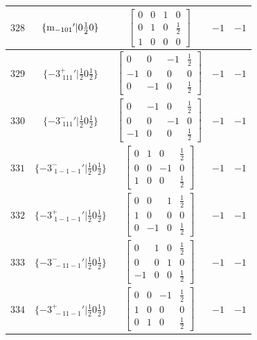 \documentclass[fleqn,8pt]{jsarticle}
\begin{document}
\begin{longtable}{ccccc}
$ 328 $ & $ \{{\rm m}_{-101}{}'|0 \frac{1}{2} 0\} $ & $ \begin{bmatrix} 0 & 0 & 1 & 0 \\ 0 & 1 & 0 & \frac{1}{2} \\ 1 & 0 & 0 & 0 \end{bmatrix} $ & $ -1 $ & $ -1 $ \\ \hline
$ 329 $ & $ \{-3^{+}_{\,\,111}{}'|\frac{1}{2} 0 \frac{1}{2}\} $ & $ \begin{bmatrix} 0 & 0 & -1 & \frac{1}{2} \\ -1 & 0 & 0 & 0 \\ 0 & -1 & 0 & \frac{1}{2} \end{bmatrix} $ & $ -1 $ & $ -1 $ \\ \hline
$ 330 $ & $ \{-3^{-}_{\,\,111}{}'|\frac{1}{2} 0 \frac{1}{2}\} $ & $ \begin{bmatrix} 0 & -1 & 0 & \frac{1}{2} \\ 0 & 0 & -1 & 0 \\ -1 & 0 & 0 & \frac{1}{2} \end{bmatrix} $ & $ -1 $ & $ -1 $ \\ \hline
$ 331 $ & $ \{-3^{-}_{\,\,1-1-1}{}'|\frac{1}{2} 0 \frac{1}{2}\} $ & $ \begin{bmatrix} 0 & 1 & 0 & \frac{1}{2} \\ 0 & 0 & -1 & 0 \\ 1 & 0 & 0 & \frac{1}{2} \end{bmatrix} $ & $ -1 $ & $ -1 $ \\ \hline
$ 332 $ & $ \{-3^{+}_{\,\,1-1-1}{}'|\frac{1}{2} 0 \frac{1}{2}\} $ & $ \begin{bmatrix} 0 & 0 & 1 & \frac{1}{2} \\ 1 & 0 & 0 & 0 \\ 0 & -1 & 0 & \frac{1}{2} \end{bmatrix} $ & $ -1 $ & $ -1 $ \\ \hline
$ 333 $ & $ \{-3^{-}_{\,\,-11-1}{}'|\frac{1}{2} 0 \frac{1}{2}\} $ & $ \begin{bmatrix} 0 & 1 & 0 & \frac{1}{2} \\ 0 & 0 & 1 & 0 \\ -1 & 0 & 0 & \frac{1}{2} \end{bmatrix} $ & $ -1 $ & $ -1 $ \\ \hline
$ 334 $ & $ \{-3^{+}_{\,\,-11-1}{}'|\frac{1}{2} 0 \frac{1}{2}\} $ & $ \begin{bmatrix} 0 & 0 & -1 & \frac{1}{2} \\ 1 & 0 & 0 & 0 \\ 0 & 1 & 0 & \frac{1}{2} \end{bmatrix} $ & $ -1 $ & $ -1 $ \\ \hline

\end{longtable}
\end{document}
